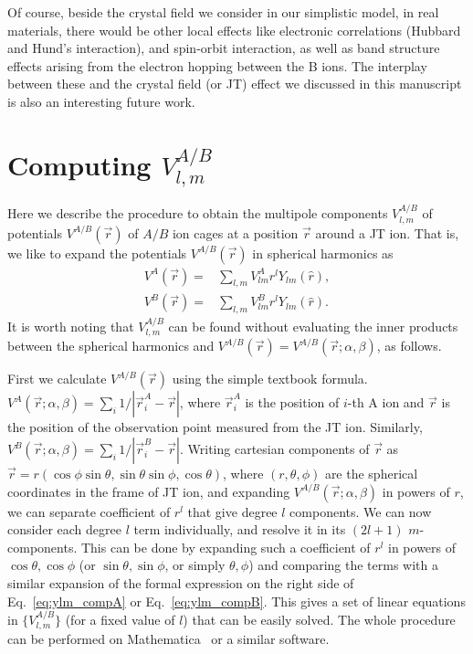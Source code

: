\documentclass[a4paper,prb,twocolumn]{revtex4-1}  %
\begin{document}
Of course, beside the crystal field we consider in our simplistic model,
in real materials,
 there would be other local effects like
electronic correlations (Hubbard and Hund's interaction), 
and spin-orbit interaction, 
as well as band structure effects arising from
the electron hopping between the B ions.
The interplay between these and the crystal field (or JT) effect 
we discussed in this manuscript is also an interesting future work.




\appendix*
\section{Computing $V_{l,m}^{A/B}$}
\label{append:multipoles}

Here we describe the procedure to obtain the multipole components 
$V_{l,m}^{A/B}$ of potentials $V^{A/B}(\vec r)$ of $A/B$ ion cages 
at a position $\vec r$ around a JT ion.
That is, we like to expand the potentials $V^{A/B}(\vec r)$
in spherical harmonics as
\begin{align}
\label{eq:ylm_compA}
V^{A}(\vec r) =& \sum_{l,m} V_{lm}^{A} r^l Y_{lm}(\hat r),\\
\label{eq:ylm_compB}
V^{B}(\vec r) =& \sum_{l,m} V_{lm}^{B} r^l Y_{lm}(\hat r).
\end{align}
It is worth noting that $V_{l,m}^{A/B}$ can be found without 
evaluating the 
inner products between the spherical harmonics and
$V^{A/B}(\vec r)=V^{A/B}(\vec r;\alpha,\beta)$, as follows.

First we calculate
$V^{A/B}(\vec r)$
using the simple textbook formula.
$V^{A}(\vec r;\alpha,\beta)=\sum_{i}1/|\vec r^A_i-\vec r |$, 
where $\vec r^A_i$ is the position of $i$-th A ion
and 
$\vec r$ is the position of the observation point 
measured from the JT ion.
Similarly,
$V^{B}(\vec r;\alpha,\beta)=\sum_{i}1/|\vec r^B_i-\vec r |$.
Writing cartesian components of $\vec r$ as
$\vec r=r(\cos\phi\sin\theta,\sin\theta\sin\phi,\cos\theta)$,
where $(r,\theta,\phi)$ 
are the spherical coordinates in the frame of JT ion,
and expanding 
${V^{A/B}(\vec r;\alpha,\beta)}$
in powers of $r$, 
we can separate 
coefficient of $r^l$
that give degree $l$ components.
We can now consider each degree $l$ term individually,
and resolve it in its $(2l+1)$ $m$-components.
This can be done by 
expanding such a coefficient of $r^l$
in powers of $\cos\theta, \cos\phi$ 
(or $\sin\theta, \sin\phi$, or simply $\theta,\phi$) 
and comparing the terms with a similar expansion of 
the formal expression on the right side 
of Eq.~\ref{eq:ylm_compA} or Eq.~\ref{eq:ylm_compB}.
This gives a set of
linear equations in $\{V_{l,m}^{A/B}\}$ (for a fixed value of $l$)
 that can be easily solved.
The whole procedure can be performed
 on Mathematica~\cite{Mathematica}
or a similar software.



\label{Bibliography}
%

\end{document}
